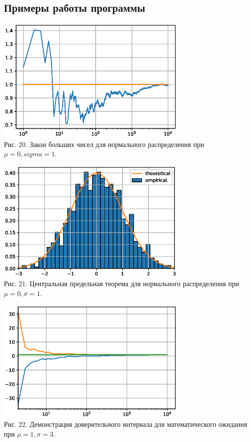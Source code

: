 \documentclass[11pt]{article}
\begin{document}
\subsection{Примеры работы программы}
\begin{center}
	\includegraphics[width=0.7\textwidth]{5_2.eps}\\
	{Рис. 20. Закон больших чисел для нормального распределения при $\mu = 0, sigma = 1$. }
\end{center}
\begin{center}
	\includegraphics[width=0.7\textwidth]{5_3.eps}\\
	{Рис. 21. Центральная предельная теорема для нормального распределения при $\mu = 0, \sigma = 1$. }
\end{center}
\begin{center}
	\includegraphics[width=0.7\textwidth]{5_4.eps}\\
	{Рис. 22. Демонстрация доверительного интервала для математического ожидания при $\mu = 1, \sigma = 3$. }
\end{center}
\end{document}
